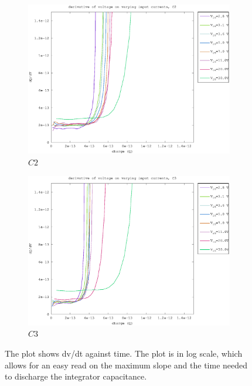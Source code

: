 \begin{figure}[h]
\begin{subfigure}[b]{0.475\textwidth}
    \includegraphics[width=\textwidth]{fig/d_slope_150fF.eps}
    \caption[]
        {$C2$}    
        \label{fig:d_slopes_150fF}
\end{subfigure}
\quad
\begin{subfigure}[b]{0.475\textwidth}   
    \centering 
    \includegraphics[width=\textwidth]{fig/d_slope_50fF.eps}
    \caption[]
        {$C3$}    
        \label{fig:d_slopes_50fF}
\end{subfigure}
\caption{The plot shows dv/dt against time. The plot is in log scale, which allows for an easy read on the maximum slope and the time needed to discharge the integrator capacitance. }
\label{fig:d_slopes}
\end{figure}




